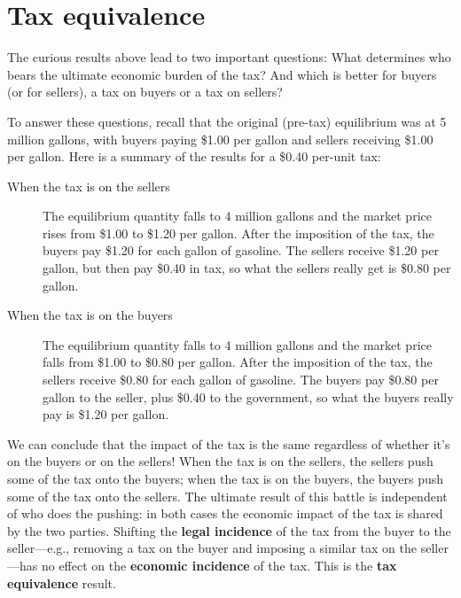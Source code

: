 



\section{Tax equivalence}
The curious results above lead to two important questions: What determines who bears the ultimate economic burden of the tax? And which is better for buyers (or for sellers), a tax on buyers or a tax on sellers?

To answer these questions, recall that the original (pre-tax) equilibrium was at 5 million gallons, with buyers paying \$1.00 per gallon and sellers receiving \$1.00 per gallon. Here is a summary of the results for a \$0.40 per-unit tax:

\begin{description}
\item [When the tax is on the sellers] The equilibrium quantity falls to 4 million gallons and the market price rises from \$1.00 to \$1.20 per gallon. After the imposition of the tax, the buyers pay \$1.20 for each gallon of gasoline. The sellers receive \$1.20 per gallon, but then pay \$0.40 in tax, so what the sellers really get is \$0.80 per gallon.

\item [When the tax is on the buyers] The equilibrium quantity falls to 4 million gallons and the market price falls from \$1.00 to \$0.80 per gallon. After the imposition of the tax, the sellers receive \$0.80 for each gallon of gasoline. The buyers pay \$0.80 per gallon to the seller, plus \$0.40 to the government, so what the buyers really pay is \$1.20 per gallon.
\end{description}

\noindent We can conclude that the impact of the tax is the same regardless of whether it's on the buyers or on the sellers! When the tax is on the sellers, the sellers push some of the tax onto the buyers; when the tax is on the buyers, the buyers push some of the tax onto the sellers. The ultimate result of this battle is independent of who does the pushing: in both cases the economic impact of the tax is shared by the two parties. Shifting the \textbf{legal incidence} of the tax from the buyer to the seller---e.g., removing a tax on the buyer and imposing a similar tax on the seller---has no effect on the \textbf{economic incidence} of the tax. This is the \textbf{tax equivalence} result.

